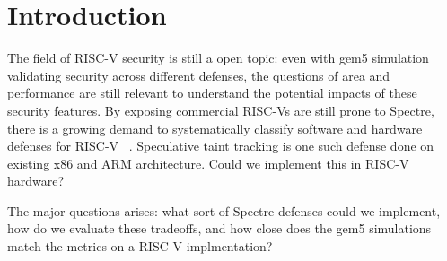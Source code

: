 \section{Introduction}
\label{sec:introduction}

 The field of RISC-V security is still a open topic: even with gem5 simulation validating security across different defenses, the  questions of area and performance are still relevant to understand the potential impacts of these security features. By exposing commercial RISC-Vs are still prone to Spectre, there is a growing demand to systematically classify software and hardware defenses for RISC-V ~\cite{Gerlach:SpectreClass:2026}. Speculative taint tracking is one such defense done on existing x86 and ARM architecture. Could we implement this in RISC-V hardware?
 
 The major questions arises: what sort of Spectre defenses could we implement, how do we evaluate these tradeoffs,  and how close does the gem5 simulations match the metrics on a RISC-V implmentation? 
